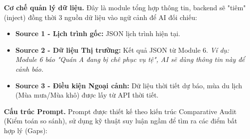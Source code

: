 \textbf{Cơ chế quản lý dữ liệu.} Đây là module tổng hợp thông tin, backend sẽ "tiêm" (inject) đồng thời 3 nguồn dữ liệu vào ngữ cảnh để AI đối chiếu:

\begin{itemize}
    \item \textbf{Source 1 - Lịch trình gốc:} JSON lịch trình hiện tại.
    \item \textbf{Source 2 - Dữ liệu Thị trường:} Kết quả JSON từ Module 6. \textit{Ví dụ: Module 6 báo "Quán A đang bị chê phục vụ tệ", AI sẽ dùng thông tin này để cảnh báo.}
    \item \textbf{Source 3 - Điều kiện Ngoại cảnh:} Dữ liệu thời tiết dự báo, mùa du lịch (Mùa mưa/Mùa khô) được lấy từ API thời tiết.
\end{itemize}

\textbf{Cấu trúc Prompt.} Prompt được thiết kế theo kiến trúc Comparative Audit (Kiểm toán so sánh), sử dụng kỹ thuật suy luận ngầm để tìm ra các điểm bất hợp lý (Gaps):

